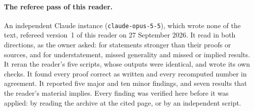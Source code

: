 \paragraph{The referee pass of this reader.}
An independent Claude instance (\texttt{claude-opus-5-5}), which wrote none of the text, refereed version~1 of this reader on 27 September 2026. It read in both directions, as the owner asked: for statements stronger than their proofs or sources, and for understatement, missed generality and missed or implied results. It reran the reader's five scripts, whose outputs were identical, and wrote its own checks. It found every proof correct as written and every recomputed number in agreement. It reported five major and ten minor findings, and seven results that the reader's material implies. Every finding was verified here before it was applied: by reading the archive at the cited page, or by an independent script.
